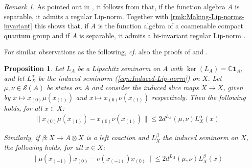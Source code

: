\documentclass{amsart}
\theoremstyle{plain}
\newtheorem{proposition}[theorem]{Proposition}
\theoremstyle{definition}
\theoremstyle{remark}
\newtheorem{remark}[theorem]{Remark}
\begin{document}
	\begin{remark}\label{rmk:Bi-invariant-regular-Lip-norms-exist}
		As pointed out in \cite[Remark 8.2]{Li09}, it follows from \cite[Proposition 1.1]{Rie02a} that, if the function algebra $A$ is separable, it admits a regular Lip-norm.
		Together with \autoref{rmk:Making-Lip-norms-invariant} this shows that, if $A$ is the function algebra of a coamenable compact quantum group and if $A$ is separable, it admits a bi-invariant regular Lip-norm \cite[Corollary 8.10]{Li09}.
	\end{remark}
	
	For similar observations as the following, \emph{cf.\@} also the proofs of \cite[Lemma 8.7]{Li09} and \cite[Proposition 14]{GEvS23}.
	
	\begin{proposition}\label{lem:Lip-estimate-for-action-OS}
		Let $L_A$ be a Lipschitz seminorm on $A$ with $\ker(L_A) = \mathbb{C}\mathbf{1}_A$, and let $L_X^\alpha$ be the induced seminorm (\ref{eqn:Induced-Lip-norm}) on $X$.
		Let $\mu, \nu \in \mathcal{S}(A)$ be states on $A$ and consider the induced slice maps $X \rightarrow X$, given by $x \mapsto x_{(0)}\mu(x_{(1)})$ and $x \mapsto x_{(0)}\nu(x_{(1)})$ respectively. 
		Then the following holds, for all $x \in X$:
		\begin{align}
			\lVert x_{(0)}\mu(x_{(1)}) - x_{(0)}\nu(x_{(1)})\rVert \leq 2 d^{L_A}(\mu,\nu) L_X^\alpha(x) 
		\end{align}
		
		Similarly, if $\beta : X \rightarrow A \otimes X$ is a left coaction and $L_X^\beta$ the induced seminorm on $X$, the following holds, for all $x \in X$:
		\begin{align}
			\lVert \mu(x_{(-1)})x_{(0)} - \nu(x_{(-1)})x_{(0)}\rVert \leq 2 d^{L_A}(\mu,\nu) L_X^\beta(x)
		\end{align}
	\end{proposition}
	
\end{document}
